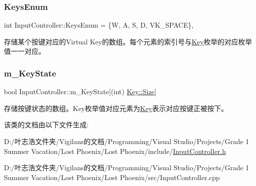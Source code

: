 \subsubsection{\texorpdfstring{Keys\+Enum}{KeysEnum}}
{\footnotesize\ttfamily int Input\+Controller\+::\+Keys\+Enum = \{\textquotesingle{}W\textquotesingle{}, \textquotesingle{}A\textquotesingle{}, \textquotesingle{}S\textquotesingle{}, \textquotesingle{}D\textquotesingle{}, V\+K\+\_\+\+S\+P\+A\+CE\}\hspace{0.3cm}{\ttfamily [static]}, {\ttfamily [private]}}



存储某个按键对应的\+Virtual Key的数组。每个元素的索引号与\hyperlink{class_input_controller_a840a7425e2220e1ef5659a7ea4ba122d}{Key}枚举的对应枚举值一一对应。 

\mbox{\label{class_input_controller_aebe382d8d20e579a3f2c92b58ad53ac3}} 
\subsubsection{\texorpdfstring{m\+\_\+\+Key\+State}{m\_KeyState}}
{\footnotesize\ttfamily bool Input\+Controller\+::m\+\_\+\+Key\+State\mbox{[}(int) \hyperlink{class_input_controller_a840a7425e2220e1ef5659a7ea4ba122da6f6cb72d544962fa333e2e34ce64f719}{Key\+::\+Size}\mbox{]}\hspace{0.3cm}{\ttfamily [private]}}



存储按键状态的数组。\+Key枚举值对应元素为\hyperlink{class_input_controller_a840a7425e2220e1ef5659a7ea4ba122d}{Key}表示对应按键正被按下。 



该类的文档由以下文件生成\+:\begin{DoxyCompactItemize}
\item 
D\+:/叶志浩文件夹/\+Vigilans的文档/\+Programming/\+Visual Studio/\+Projects/\+Grade 1 Summer Vacation/\+Lost Phoenix/\+Lost Phoenix/include/\hyperlink{_input_controller_8h}{Input\+Controller.\+h}\item 
D\+:/叶志浩文件夹/\+Vigilans的文档/\+Programming/\+Visual Studio/\+Projects/\+Grade 1 Summer Vacation/\+Lost Phoenix/\+Lost Phoenix/src/Input\+Controller.\+cpp\end{DoxyCompactItemize}
